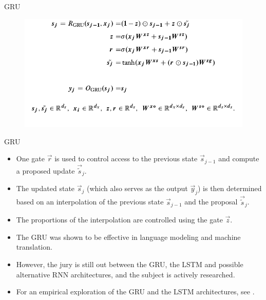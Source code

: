 \documentclass[handout]{beamer}
\begin{document}
\begin{frame}{GRU}
  \begin{figure}[h]
        	\includegraphics[scale = 0.35]{pics/GRU.png}
        \end{figure}        
\end{frame}



\begin{frame}{GRU}
\begin{scriptsize}
\begin{itemize}
\item One gate $\vec{r}$ is used to control access to the previous state $\vec{s}_{j-1}$ and compute a proposed update $\vec{\widetilde{s}}_j$.
\item The updated state $\vec{s}_j$ (which also serves as the output $\vec{y}_j$) is then determined based on an interpolation of the previous state $\vec{s}_{j-1}$ and the proposal $\vec{\widetilde{s}}_j$.
\item The proportions of the interpolation are controlled using the gate $\vec{z}$.
\item The GRU was shown to be effective in language modeling and machine translation.
\item However, the jury is still out between the GRU, the LSTM and possible alternative RNN architectures, and the subject is actively researched. 
\item For an empirical exploration of the GRU and the LSTM architectures, see \cite{jozefowicz2015empirical}.
\end{itemize}
\end{scriptsize}
\end{frame}
\end{document}
